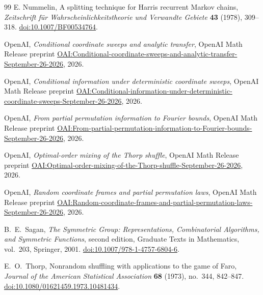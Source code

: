 \begin{thebibliography}{99}
E. Nummelin,
A splitting technique for Harris recurrent Markov chains,
\emph{Zeitschrift f\"ur Wahrscheinlichkeitstheorie und Verwandte Gebiete}
\textbf{43} (1978), 309--318.
\href{https://doi.org/10.1007/BF00534764}{doi:10.1007/BF00534764}.

OpenAI,
\emph{Conditional coordinate sweeps and analytic transfer},
OpenAI Math Release preprint
\href{https://github.com/openai/math/blob/main/preprints/Conditional-coordinate-sweeps-and-analytic-transfer-September-26-2026/main.pdf}{OAI:Conditional-coordinate-sweeps-and-analytic-transfer-September-26-2026},
2026.

OpenAI,
\emph{Conditional information under deterministic coordinate sweeps},
OpenAI Math Release preprint
\href{https://github.com/openai/math/blob/main/preprints/Conditional-information-under-deterministic-coordinate-sweeps-September-26-2026/main.pdf}{OAI:Conditional-information-under-deterministic-coordinate-sweeps-September-26-2026},
2026.

OpenAI,
\emph{From partial permutation information to Fourier bounds},
OpenAI Math Release preprint
\href{https://github.com/openai/math/blob/main/preprints/From-partial-permutation-information-to-Fourier-bounds-September-26-2026/main.pdf}{OAI:From-partial-permutation-information-to-Fourier-bounds-September-26-2026},
2026.

OpenAI,
\emph{Optimal-order mixing of the Thorp shuffle},
OpenAI Math Release preprint
\href{https://github.com/openai/math/blob/main/preprints/Optimal-order-mixing-of-the-Thorp-shuffle-September-26-2026/paper.pdf}{OAI:Optimal-order-mixing-of-the-Thorp-shuffle-September-26-2026},
2026.

OpenAI,
\emph{Random coordinate frames and partial permutation laws},
OpenAI Math Release preprint
\href{https://github.com/openai/math/blob/main/preprints/Random-coordinate-frames-and-partial-permutation-laws-September-26-2026/main.pdf}{OAI:Random-coordinate-frames-and-partial-permutation-laws-September-26-2026},
2026.

B.~E.~Sagan,
\emph{The Symmetric Group: Representations, Combinatorial Algorithms,
and Symmetric Functions}, second edition,
Graduate Texts in Mathematics, vol.~203, Springer, 2001.
\href{https://doi.org/10.1007/978-1-4757-6804-6}
{doi:10.1007/978-1-4757-6804-6}.

E.~O.~Thorp,
Nonrandom shuffling with applications to the game of Faro,
\emph{Journal of the American Statistical Association} \textbf{68}
(1973), no.~344, 842--847.
\href{https://doi.org/10.1080/01621459.1973.10481434}
{doi:10.1080/01621459.1973.10481434}.

\end{thebibliography}
